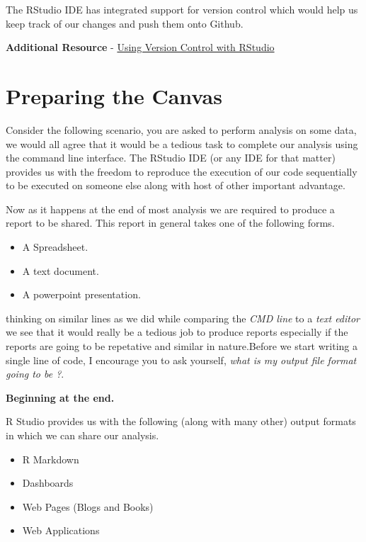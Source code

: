 \documentclass[]{book}
\providecommand{\tightlist}{%
  \setlength{\itemsep}{0pt}\setlength{\parskip}{0pt}}
\theoremstyle{definition}
\theoremstyle{definition}
\theoremstyle{definition}
\theoremstyle{remark}
\begin{document}
The RStudio IDE has integrated support for version control which would
help us keep track of our changes and push them onto Github.

\textbf{Additional Resource} -
\href{https://support.rstudio.com/hc/en-us/articles/200532077-Version-Control-with-Git-and-SVN}{Using
Version Control with RStudio}

\chapter{Preparing the Canvas}\label{preparing-the-canvas}

Consider the following scenario, you are asked to perform analysis on
some data, we would all agree that it would be a tedious task to
complete our analysis using the command line interface. The RStudio IDE
(or any IDE for that matter) provides us with the freedom to reproduce
the execution of our code sequentially to be executed on someone else
along with host of other important advantage.

Now as it happens at the end of most analysis we are required to produce
a report to be shared. This report in general takes one of the following
forms.

\begin{itemize}
\tightlist
\item
  A Spreadsheet.
\item
  A text document.
\item
  A powerpoint presentation.
\end{itemize}

thinking on similar lines as we did while comparing the \emph{CMD line}
to a \emph{text editor} we see that it would really be a tedious job to
produce reports especially if the reports are going to be repetative and
similar in nature.Before we start writing a single line of code, I
encourage you to ask yourself, \emph{what is my output file format going
to be ?}.

\textbf{Beginning at the end.}

R Studio provides us with the following (along with many other) output
formats in which we can share our analysis.

\begin{itemize}
\tightlist
\item
  R Markdown
\item
  Dashboards
\item
  Web Pages (Blogs and Books)
\item
  Web Applications
\end{itemize}
\end{document}
